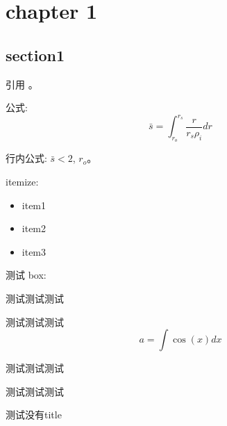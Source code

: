 
\chapter{chapter 1}


\section{section1}
引用 \cite{tuszewski1988field}。

公式:
\begin{equation}
\bar{s} = \int_{r_o}^{r_s} \frac{r}{r_s \rho_i}   dr
\end{equation}

行内公式: $\bar{s}<2$, $r_o$。



itemize:
\begin{itemize}
\item item1
\item item2
\item item3
\end{itemize}

测试 box:
\begin{tcolorbox}
    [colback = Emerald!10, colframe = cyan!40!black, 
    title = title here]
    测试测试测试
\end{tcolorbox}


\begin{tcolorbox}[colback=OliveGreen!10,colframe=Green!70,
    title=title here]
    测试测试测试
    \begin{equation}
        a = \int \cos(x) dx
    \end{equation}
\end{tcolorbox}


\begin{tcolorbox}[colback=red!5,colframe=red!75!black,
    title = title here
    ]
    测试测试测试
\end{tcolorbox}

\begin{tcolorbox}
    [colback=Salmon!20, colframe=Salmon!90!Black,
    title = title here
    ]
    测试测试测试
\end{tcolorbox}

\begin{tcolorbox}
    [colback=Salmon!20, colframe=Salmon!90!Black
    ]
    测试没有title
\end{tcolorbox}



